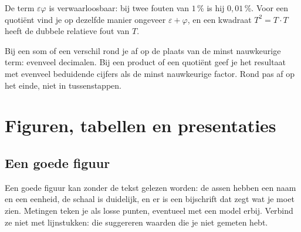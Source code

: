 De term $\varepsilon\varphi$ is verwaarloosbaar: bij twee fouten van $1$\,\% is hij $0{,}01$\,\%. Voor een quotiënt vind je op dezelfde manier ongeveer $\varepsilon + \varphi$, en een kwadraat $T^2 = T \cdot T$ heeft de dubbele relatieve fout van $T$.


\begin{werkwijze}
Bij een som of een verschil rond je af op de plaats van de minst nauwkeurige term: evenveel decimalen. Bij een product of een quotiënt geef je het resultaat met evenveel beduidende cijfers als de minst nauwkeurige factor. Rond pas af op het einde, niet in tussenstappen.
\end{werkwijze}

\begin{oefeningen}

\end{oefeningen}

\section{Figuren, tabellen en presentaties}

\subsection{Een goede figuur}

Een goede figuur kan zonder de tekst gelezen worden: de assen hebben een naam en een eenheid, de schaal is duidelijk, en er is een bijschrift dat zegt wat je moet zien. Metingen teken je als losse punten, eventueel met een model erbij. Verbind ze niet met lijnstukken: die suggereren waarden die je niet gemeten hebt.

